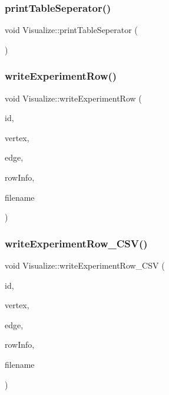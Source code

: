 \subsubsection{\texorpdfstring{print\+Table\+Seperator()}{printTableSeperator()}}
{\footnotesize\ttfamily void Visualize\+::print\+Table\+Seperator (\begin{DoxyParamCaption}{ }\end{DoxyParamCaption})}

\mbox{\label{class_visualize_a8aefacec622221533485db6701d1119e}} 
\subsubsection{\texorpdfstring{write\+Experiment\+Row()}{writeExperimentRow()}}
{\footnotesize\ttfamily void Visualize\+::write\+Experiment\+Row (\begin{DoxyParamCaption}\item[{int}]{id,  }\item[{int}]{vertex,  }\item[{int}]{edge,  }\item[{std\+::vector$<$ \hyperlink{struct_utility_structs_1_1_storage_items}{Utility\+Structs\+::\+Storage\+Items} $>$}]{row\+Info,  }\item[{std\+::string}]{filename }\end{DoxyParamCaption})}

\mbox{\label{class_visualize_a8677a063c82af1b37b94c7d3a3ca3746}} 
\subsubsection{\texorpdfstring{write\+Experiment\+Row\+\_\+\+C\+S\+V()}{writeExperimentRow\_CSV()}}
{\footnotesize\ttfamily void Visualize\+::write\+Experiment\+Row\+\_\+\+C\+SV (\begin{DoxyParamCaption}\item[{int}]{id,  }\item[{int}]{vertex,  }\item[{int}]{edge,  }\item[{std\+::vector$<$ \hyperlink{struct_utility_structs_1_1_storage_items}{Utility\+Structs\+::\+Storage\+Items} $>$}]{row\+Info,  }\item[{std\+::string}]{filename }\end{DoxyParamCaption})}

